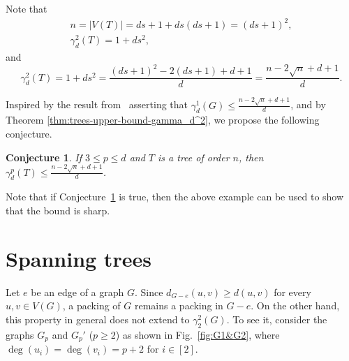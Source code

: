 \documentclass[12pt]{article}
\newtheorem{conjecture}[theorem]{Conjecture}
\newcommand{\mrho}{\gamma_2^2}
\begin{document}
Note that
\begin{equation*}
    \begin{gathered}
	n=|V(T)|=ds+1+ds(ds+1)=(ds+1)^2,\\
		\gamma_d^2(T)=1+ds^2,
    \end{gathered}
\end{equation*}
and
\begin{equation*}
    \gamma_d^2(T)=1+ds^2=\frac{(ds+1)^2-2(ds+1)+d+1}{d}=\frac{n-2\sqrt{n}+d+1}{d}.
\end{equation*}

Inspired by the result from~\cite{Gimbel-1996} asserting that $\gamma_d^1(G) \leq \frac{n-2\sqrt{n}+d+1}{d}$, and by Theorem \ref{thm:trees-upper-bound-gamma_d^2}, we propose the following conjecture.

\begin{conjecture}
    \label{conj:trees-upper-bound-gamma_d^p}
If $3 \leq p \leq d$ and $T$ is a tree of order $n$, then $\gamma_d^p(T) \leq \frac{n-2\sqrt{n}+d+1}{d}$.
\end{conjecture}

Note that if Conjecture~\ref{conj:trees-upper-bound-gamma_d^p} is true, then the above example can be used to show that the bound is sharp. 


\section{Spanning trees}
\label{sec:spanning-trees}

Let $e$ be an edge of a graph $G$. Since $d_{G-e}(u,v) \ge d(u,v)$ for every $u,v\in V(G)$, a packing of $G$ remains a packing in $G-e$. On the other hand, this property in general does not extend to $\mrho(G)$. To see it, consider the graphs $G_{p}$ and $G_{p}'$ ($p\ge 2$) as shown in Fig.~\ref{fig:G1&G2}, where $\deg(u_i) = \deg(v_i) = p+2$ for $i \in [2]$.
\end{document}
